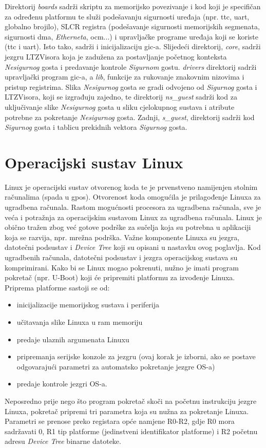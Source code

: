 \documentclass[times, utf8, diplomski, numeric]{fer}
\begin{document}
Direktorij \textit{boards} sadrži skriptu za memorijsko povezivanje i kod koji je specifičan za određenu platformu te služi
podešavanju sigurnosti uređaja (npr. \gls{ttc}, \gls{uart}, globalno brojilo), SLCR registra (podešavanje sigurnosti memorijskih
segmenata, sigurnosti \gls{dma}, \textit{Etherneta}, \gls{ocm}...) i upravljačke programe uređaja koji se koriste (\gls{ttc} i \gls{uart}). Isto tako,
sadrži i inicijalizaciju \gls{gic}-a. Slijedeći direktorij, \textit{core}, sadrži jezgru LTZVisora koja je zadužena za postavljanje
početnog konteksta \textit{Nesigurnog} gosta i predavanje kontrole \textit{Sigurnom} gostu. \textit{drivers} direktorij sadrži upravljački
program \gls{gic}-a, a \textit{lib}, funkcije za rukovanje znakovnim nizovima i pristup registrima. Slika \textit{Nesigurnog} gosta se gradi
odvojeno od \textit{Sigurnog} gosta i LTZVisora, koji se izgrađuju zajedno, te direktorij \textit{ns\_guest} sadrži kod za uključivanje
slike \textit{Nesigurnog} gosta u sliku cjelokupnog sustava i atribute potrebne za pokretanje \textit{Nesigurnog} gosta. Zadnji,
\textit{s\_guest}, direktorij sadrži kod \textit{Sigurnog} gosta i tablicu prekidnih vektora \textit{Sigurnog} gosta.

\chapter{Operacijski sustav Linux}
Linux je operacijski sustav otvorenog koda te je prvenstveno namijenjen stolnim računalima (spada u \gls{gpos}).
Otvorenost koda omogućila je prilagođenje Linuxa za ugradbena računala.
Rastom mogućnosti procesora za ugradbena računala, sve je veća i potražnja za operacijskim sustavom Linux za ugradbena
računala. Linux je obično tražen zbog već gotove podrške za sučelja koja su potrebna u aplikaciji koja se razvija, npr.
mrežna podrška. Važne komponente Linuxa su jezgra, datotečni podsustav i \textit{Device Tree} koji su opisani u nastavku
ovog poglavlja. Kod ugradbenih računala, datotečni podsustav i jezgra operacijskog sustava su komprimirani.
Kako bi se Linux mogao pokrenuti, nužno je imati program pokretač (npr. U-Boot) koji će pripremiti platformu za izvođenje
Linuxa. Priprema platforme sastoji se od:
\begin{itemize}
  \item{inicijalizacije memorijskog sustava i periferija}
  \item{učitavanja slike Linuxa u \gls{ram} memoriju}
  \item{predaje ulaznih argumenata Linuxu}
  \item{pripremanja serijske konzole za jezgru (ovaj korak je izborni, ako se postave odgovarajući parametri za automatsko
  pokretanje jezgre OS-a)}
  \item{predaje kontrole jezgri OS-a.}
\end{itemize}
Neposredno prije nego što program pokretač skoči na početnu instrukciju jezgre Linuxa, pokretač
pripremi tri parametra koja su nužna za pokretanje Linuxa. Parametri se prenose preko registara opće namjene R0-R2, gdje
R0 mora sadržavati 0, R1 tip platforme (jedinstveni identifikator platforme) i R2 početnu adresu \textit{Device Tree} binarne
datoteke.
\end{document}

